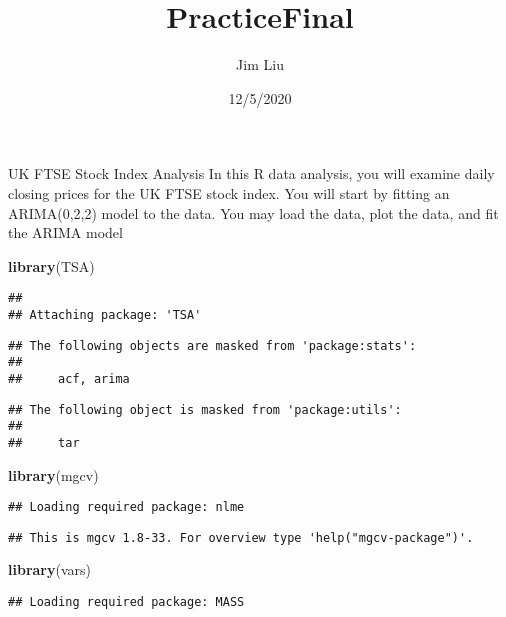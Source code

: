 \documentclass[
]{article}
\title{PracticeFinal}
\author{Jim Liu}
\date{12/5/2020}
\newenvironment{Shaded}{\begin{snugshade}}{\end{snugshade}}
\newcommand{\KeywordTok}[1]{\textcolor[rgb]{0.13,0.29,0.53}{\textbf{#1}}}
\newcommand{\NormalTok}[1]{#1}
\begin{document}
\maketitle

UK FTSE Stock Index Analysis In this R data analysis, you will examine
daily closing prices for the UK FTSE stock index. You will start by
fitting an ARIMA(0,2,2) model to the data. You may load the data, plot
the data, and fit the ARIMA model

\begin{Shaded}
\begin{Highlighting}[]
\KeywordTok{library}\NormalTok{(TSA)}
\end{Highlighting}
\end{Shaded}

\begin{verbatim}
## 
## Attaching package: 'TSA'
\end{verbatim}

\begin{verbatim}
## The following objects are masked from 'package:stats':
## 
##     acf, arima
\end{verbatim}

\begin{verbatim}
## The following object is masked from 'package:utils':
## 
##     tar
\end{verbatim}

\begin{Shaded}
\begin{Highlighting}[]
\KeywordTok{library}\NormalTok{(mgcv)}
\end{Highlighting}
\end{Shaded}

\begin{verbatim}
## Loading required package: nlme
\end{verbatim}

\begin{verbatim}
## This is mgcv 1.8-33. For overview type 'help("mgcv-package")'.
\end{verbatim}

\begin{Shaded}
\begin{Highlighting}[]
\KeywordTok{library}\NormalTok{(vars)}
\end{Highlighting}
\end{Shaded}

\begin{verbatim}
## Loading required package: MASS
\end{verbatim}
\end{document}
